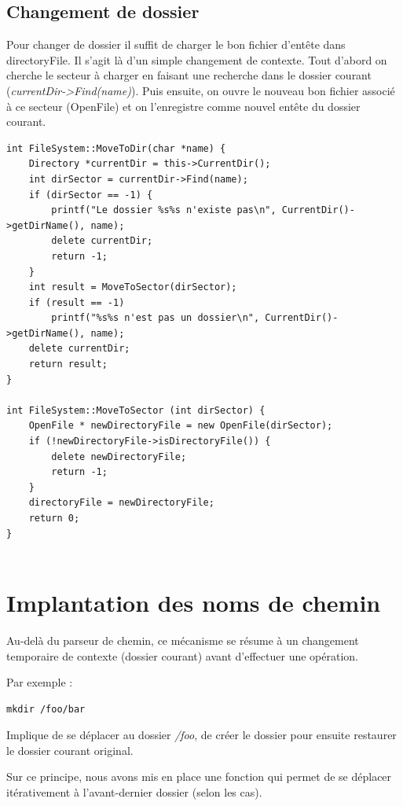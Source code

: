 \documentclass[a4paper,10pt]{article}
\begin{document}
\subsection{Changement de dossier}

Pour changer de dossier il suffit de charger le bon fichier d'entête dans
directoryFile. Il s'agit là d'un simple changement de contexte. Tout d'abord on
cherche le secteur à charger en faisant une recherche dans le dossier courant
(\textit{currentDir->Find(name)}). Puis ensuite, on ouvre le nouveau bon
fichier associé à ce secteur (OpenFile) et on l'enregistre comme nouvel entête
du dossier courant.

\begin{lstlisting}
int FileSystem::MoveToDir(char *name) {
    Directory *currentDir = this->CurrentDir();
    int dirSector = currentDir->Find(name);
    if (dirSector == -1) {
        printf("Le dossier %s%s n'existe pas\n", CurrentDir()->getDirName(), name);
        delete currentDir;
        return -1;
    }
    int result = MoveToSector(dirSector);
    if (result == -1)
        printf("%s%s n'est pas un dossier\n", CurrentDir()->getDirName(), name);
    delete currentDir;
    return result;
}

int FileSystem::MoveToSector (int dirSector) {
    OpenFile * newDirectoryFile = new OpenFile(dirSector);
    if (!newDirectoryFile->isDirectoryFile()) {
        delete newDirectoryFile;
        return -1;
    }
    directoryFile = newDirectoryFile;
    return 0;
}


\end{lstlisting}

\section{Implantation des noms de chemin}

Au-delà du parseur de chemin, ce mécanisme se résume à un changement temporaire
de contexte (dossier courant) avant d'effectuer une opération.

Par exemple :
\begin{lstlisting}
mkdir /foo/bar
\end{lstlisting}

Implique de se déplacer au dossier \textit{/foo}, de créer le dossier
 pour ensuite restaurer le dossier courant original.

Sur ce principe, nous avons mis en place une fonction qui permet de se déplacer
itérativement à l'avant-dernier dossier (selon les cas).
\end{document}
